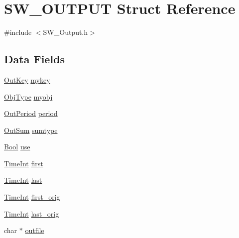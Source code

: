 \hypertarget{struct_s_w___o_u_t_p_u_t}{}\section{S\+W\+\_\+\+O\+U\+T\+P\+UT Struct Reference}
\label{struct_s_w___o_u_t_p_u_t}


{\ttfamily \#include $<$S\+W\+\_\+\+Output.\+h$>$}

\subsection*{Data Fields}
\begin{DoxyCompactItemize}
\item 
\hyperlink{_s_w___output_8h_a02baefdececdc5dc8b1b48f924a03d73}{Out\+Key} \hyperlink{struct_s_w___o_u_t_p_u_t_a48c42889301263af4fee4078171f5bb9}{mykey}
\item 
\hyperlink{_s_w___defines_8h_a21ada50c882656c2a4723dde25f56d4a}{Obj\+Type} \hyperlink{struct_s_w___o_u_t_p_u_t_ad0253c3c36027641f106440b9e04338a}{myobj}
\item 
\hyperlink{_s_w___output_8h_ad4bca29edbc3cfff634f5c23d1cefb1c}{Out\+Period} \hyperlink{struct_s_w___o_u_t_p_u_t_a5ebae03675583fe9acd158fd8cfcf877}{period}
\item 
\hyperlink{_s_w___output_8h_af6bc39c9780566b4a3891132f6977362}{Out\+Sum} \hyperlink{struct_s_w___o_u_t_p_u_t_a2a29e58833af5162fa6dbc14c307af68}{sumtype}
\item 
\hyperlink{generic_8h_a39db6982619d623273fad8a383489309}{Bool} \hyperlink{struct_s_w___o_u_t_p_u_t_a86d069d21282a56d0f4b730eba846c37}{use}
\item 
\hyperlink{_times_8h_a25ac787161a5cad0e3fdfe5a5aeb3236}{Time\+Int} \hyperlink{struct_s_w___o_u_t_p_u_t_a9bfbb118c01c4f57f87d11fc53859756}{first}
\item 
\hyperlink{_times_8h_a25ac787161a5cad0e3fdfe5a5aeb3236}{Time\+Int} \hyperlink{struct_s_w___o_u_t_p_u_t_afbc2eca291a2288745d102a34c32d938}{last}
\item 
\hyperlink{_times_8h_a25ac787161a5cad0e3fdfe5a5aeb3236}{Time\+Int} \hyperlink{struct_s_w___o_u_t_p_u_t_a28a2b9c7bfdb4e5a8078386212e91545}{first\+\_\+orig}
\item 
\hyperlink{_times_8h_a25ac787161a5cad0e3fdfe5a5aeb3236}{Time\+Int} \hyperlink{struct_s_w___o_u_t_p_u_t_ae0dee45cd60304d876e3a6835fab4757}{last\+\_\+orig}
\item 
char $\ast$ \hyperlink{struct_s_w___o_u_t_p_u_t_ad1ffdf6de051cc2520fe539415c31227}{outfile}

\end{DoxyCompactItemize}
